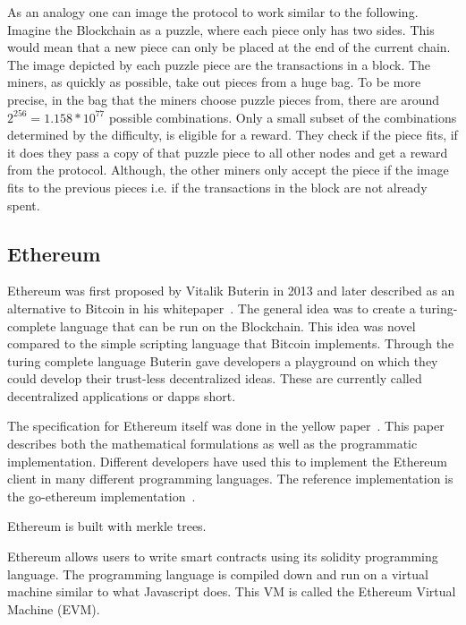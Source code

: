 As an analogy one can image the protocol to work similar to the following. Imagine the Blockchain as a puzzle, where each piece only has two sides. This would mean that a new piece can only be placed at the end of the current chain. The image depicted by each puzzle piece are the transactions in a block. The miners, as quickly as possible, take out pieces from a huge bag. To be more precise, in the bag that the miners choose puzzle pieces from, there are around $2^{256} = 1.158 * 10^{77}$ possible combinations. Only a small subset of the combinations determined by the difficulty, is eligible for a reward. They check if the piece fits, if it does they pass a copy of that puzzle piece to all other nodes and get a reward from the protocol. Although, the other miners only accept the piece if the image fits to the previous pieces i.e. if the transactions in the block are not already spent.

\subsection{Ethereum}
Ethereum was first proposed by Vitalik Buterin in 2013 and later described as an alternative to Bitcoin in his whitepaper~\cite{ethereum_wp}. The general idea was to create a turing-complete language that can be run on the Blockchain. This idea was novel compared to the simple scripting language that Bitcoin implements. Through the turing complete language Buterin gave developers a playground on which they could develop their trust-less decentralized ideas. These are currently called decentralized applications or dapps short. 

The specification for Ethereum itself was done in the yellow paper~\cite{ethereum_yp}. This paper describes both the mathematical formulations as well as the programmatic implementation. Different developers have used this to implement the Ethereum client in many different programming languages. The reference implementation is the go-ethereum implementation~\cite{}.

Ethereum is built with merkle trees.

Ethereum allows users to write smart contracts using its solidity programming language. The programming language is compiled down and run on a virtual machine similar to what Javascript does. This VM is called the Ethereum Virtual Machine (EVM). 

